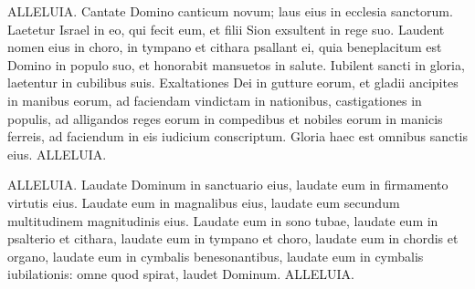 \begin{biblechapter}  
\verse ALLELUIA. Cantate Domino canticum novum; laus eius in ecclesia sanctorum. 
\verse Laetetur Israel in eo, qui fecit eum, et filii Sion exsultent in rege suo. 
\verse Laudent nomen eius in choro, in tympano et cithara psallant ei, 
\verse quia beneplacitum est Domino in populo suo, et honorabit mansuetos in salute. 
\verse Iubilent sancti in gloria, laetentur in cubilibus suis. 
\verse Exaltationes Dei in gutture eorum, et gladii ancipites in manibus eorum, 
\verse ad faciendam vindictam in nationibus, castigationes in populis, 
\verse ad alligandos reges eorum in compedibus et nobiles eorum in manicis ferreis, 
\verse ad faciendum in eis iudicium conscriptum. Gloria haec est omnibus sanctis eius. ALLELUIA. 
\end{biblechapter}

\begin{biblechapter}  
\verse ALLELUIA. Laudate Dominum in sanctuario eius, laudate eum in firmamento virtutis eius. 
\verse Laudate eum in magnalibus eius, laudate eum secundum multitudinem magnitudinis eius. 
\verse Laudate eum in sono tubae, laudate eum in psalterio et cithara, 
\verse laudate eum in tympano et choro, laudate eum in chordis et organo, 
\verse laudate eum in cymbalis benesonantibus, laudate eum in cymbalis iubilationis: omne quod spirat, laudet Dominum. ALLELUIA.
\end{biblechapter}
